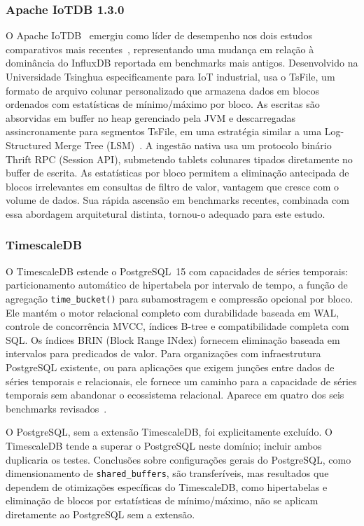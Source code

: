 \subsubsection{Apache IoTDB 1.3.0}

O Apache IoTDB~\citep{wang2023iotdb} emergiu como líder de desempenho nos dois
estudos comparativos mais recentes~\citep{pereira2023mulletbench,wang2023iotdb}, representando
uma mudança em relação à dominância do InfluxDB reportada em benchmarks mais antigos.
Desenvolvido na Universidade Tsinghua especificamente para IoT industrial, usa o TsFile, um
formato de arquivo colunar personalizado que armazena dados em blocos ordenados com estatísticas
de mínimo/máximo por bloco. As escritas são absorvidas em buffer no heap gerenciado pela JVM e
descarregadas assincronamente para segmentos TsFile, em uma estratégia similar a uma
Log-Structured Merge Tree (LSM)~\citep{oneil1996lsm}. A ingestão nativa usa um protocolo
binário Thrift RPC (Session API), submetendo tablets colunares tipados diretamente no buffer
de escrita. As estatísticas por bloco permitem a eliminação antecipada de blocos irrelevantes
em consultas de filtro de valor, vantagem que cresce com o volume de dados. Sua rápida ascensão
em benchmarks recentes, combinada com essa abordagem arquitetural distinta, tornou-o adequado
para este estudo.

\subsubsection{TimescaleDB}

O TimescaleDB estende o PostgreSQL~15 com capacidades de séries temporais: particionamento
automático de hipertabela por intervalo de tempo, a função de agregação \texttt{time\_bucket()}
para subamostragem e compressão opcional por bloco. Ele mantém o motor relacional completo com durabilidade baseada em WAL, controle de
concorrência MVCC, índices B-tree e compatibilidade completa com SQL. Os índices BRIN
(Block Range INdex) fornecem eliminação baseada em intervalos para predicados de valor. Para organizações com infraestrutura PostgreSQL existente, ou para aplicações
que exigem junções entre dados de séries temporais e relacionais, ele fornece um caminho para
a capacidade de séries temporais sem abandonar o ecossistema relacional. Aparece em quatro dos
seis benchmarks revisados~\citep{shah2022performance,lima2024avaliando,wang2023iotdb,grzesik2020comparative}.

O PostgreSQL, sem a extensão TimescaleDB, foi explicitamente excluído. O TimescaleDB
tende a superar o PostgreSQL neste domínio; incluir ambos duplicaria os testes.
Conclusões sobre configurações gerais do PostgreSQL, como dimensionamento de
\texttt{shared\_buffers}, são transferíveis, mas resultados que dependem de otimizações
específicas do TimescaleDB, como hipertabelas e eliminação de blocos por estatísticas de
mínimo/máximo, não se aplicam diretamente ao PostgreSQL sem a extensão.


